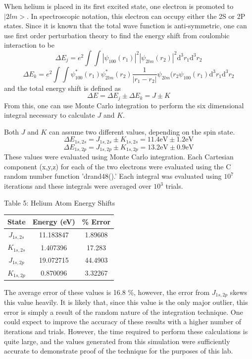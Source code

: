 \documentclass[12pt]{article}
\begin{document}
When helium is placed in its first excited state, one electron is promoted to $|2 l m>$.  In spectroscopic notation, this electron can occupy either the 2S or 2P states.  Since it is known that the total wave function is anti-symmetric, one can use first order perturbation theory to find the energy shift from coulombic interaction to be
\begin{equation}
\label{Ej}
\Delta E_j = e^2 \int \int |\psi_{100}(r_1)|^2 |\psi_{2lm}(r_2)|^2 \mathrm{d}^3r_1 \mathrm{d}^3r_2
\end{equation}
\begin{equation}
\label{Ek}
\Delta E_k = e^2 \int \int \psi^*_{100}(r_1) \psi^*_{2lm}(r_2)\frac{1}{|r_1-r_2|}\psi_{2lm}(r_2 \psi_{100}(r_1) \mathrm{d}^3r_1 \mathrm{d}^3r_2
\end{equation}
and the total energy shift is defined as
\begin{equation}
\label{DeltaE}
\Delta E = \Delta E_j \pm \Delta E_k = J \pm K
\end{equation}
From this, one can use Monte Carlo integration to perform the six dimensional integral necessary to calculate $J$ and $K$.

Both $J$ and $K$ can assume two different values, depending on the spin state.
\begin{equation}
\label{DeltaE2S}
\Delta E_{1s,2s} = J_{1s,2s} \pm K_{1s,2s} = 11.4 \mathrm{eV} \pm 1.2 \mathrm{eV}
\end{equation}
\begin{equation}
\label{DeltaE2P}
\Delta E_{1s,2p} = J_{1s,2p} \pm K_{1s,2p} = 13.2 \mathrm{eV} \pm 0.9 \mathrm{eV}
\end{equation}
These values were evaluated using Monte Carlo integration.  Each Cartesian component (x,y,z) for each of the two electrons were evaluated using the C random number function 'drand48().'  Each integral was evaluated using $10^7$ iterations and these integrals were averaged over $10^3$ trials.  
\begin{center}
Table 5:  Helium Atom Energy Shifts \\
\begin{tabular}{ | c | c | c|}
\hline
State&Energy (eV) &\% Error \\ \hline
$J_{1s,2s}$&	11.183847&1.89608 \\ \hline
$K_{1s,2s}$&	1.407396& 17.283\\ \hline
$J_{1s,2p}$&	19.072715&44.4903 \\ \hline
$K_{1s,2p}$&	0.870096&3.32267 \\ \hline
\end{tabular}
\end{center}
The average error of these values is 16.8 \%, however, the error from $J_{1s,2p}$ skews this value heavily.  It is likely that, since this value is the only major outlier, this error is simply a result of the random nature of the integration technique.  One could expect to improve the accuracy of these results with a higher number of iterations and trials.  However, the time required to perform these calculations is quite large, and the values generated from this simulation were sufficiently accurate to demonstrate proof of the technique for the purposes of this lab.
\end{document}
